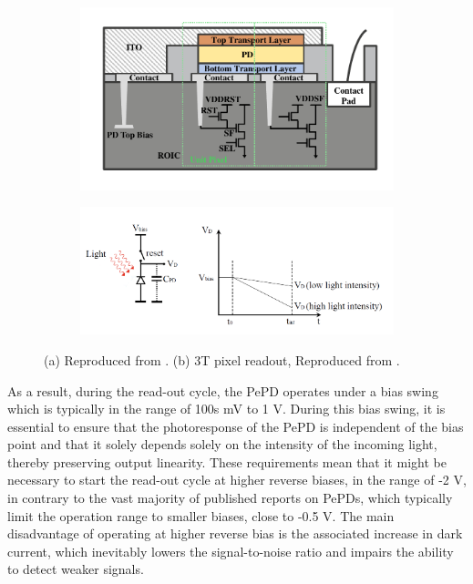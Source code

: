 \begin{figure}[htbp]
    \centering
    \begin{subfigure}[t]{0.6\textwidth} %
        \centering
        \includegraphics[width=\textwidth]{chapters/introduction/image/imager_cross_section.pdf} %
        \caption{}
        \label{}
    \end{subfigure}
    \hfill %
    \begin{subfigure}[t]{0.99\textwidth} %
        \centering
        \includegraphics[width=\textwidth]{chapters/introduction/image/3T_pixel_readout.png} %
        \caption{}
        \label{}
    \end{subfigure}

    \caption{(a) Reproduced from \cite{Kim2022DetailedSensors}. (b) 3T pixel readout, Reproduced from \cite{Pejovic2023ColloidalInfrared}.}
    \label{fig:ch1:cmos_roic}
\end{figure}


As a result, during the read-out cycle, the PePD operates under a bias swing which is typically in the range of 100s mV to 1 V. During this bias swing, it is essential to ensure that the photoresponse of the PePD is independent of the bias point and that it solely depends solely on the intensity of the incoming light, thereby preserving output linearity. These requirements mean that it might be necessary to start the read-out cycle at higher reverse biases, in the range of -2 V, in contrary to the vast majority of published reports on PePDs, which typically limit the operation range to smaller biases, close to -0.5 V. The main disadvantage of operating at higher reverse bias is the associated increase in dark current, which inevitably lowers the signal-to-noise ratio and impairs the ability to detect weaker signals.


